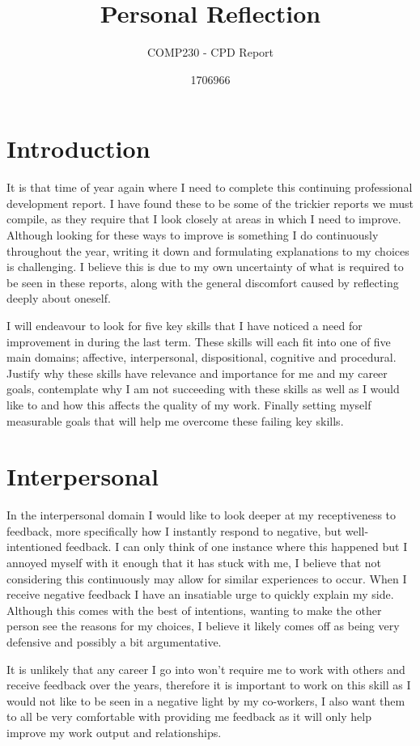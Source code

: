 \documentclass{scrartcl}
\title{Personal Reflection}
\subtitle{COMP230 - CPD Report}
\author{1706966}
\begin{document}
\maketitle

\section{Introduction}
It is that time of year again where I need to complete this continuing professional development report. I have found these to be some of the trickier reports we must compile, as they require that I look closely at areas in which I need to improve. Although looking for these ways to improve is something I do continuously throughout the year, writing it down and formulating explanations to my choices is challenging. I believe this is due to my own uncertainty of what is required to be seen in these reports, along with the general discomfort caused by reflecting deeply about oneself.

I will endeavour to look for five key skills that I have noticed a need for improvement in during the last term. These skills will each fit into one of five main domains; affective, interpersonal, dispositional, cognitive and procedural. Justify why these skills have relevance and importance for me and my career goals, contemplate why I am not succeeding with these skills as well as I would like to and how this affects the quality of my work. Finally setting myself measurable goals that will help me overcome these failing key skills.

\section{Interpersonal}
In the interpersonal domain I would like to look deeper at my receptiveness to feedback, more specifically how I instantly respond to negative, but well-intentioned feedback. I can only think of one instance where this happened but I annoyed myself with it enough that it has stuck with me, I believe that not considering this continuously may allow for similar experiences to occur. When I receive negative feedback I have an insatiable urge to quickly explain my side. Although this comes with the best of intentions, wanting to make the other person see the reasons for my choices, I believe it likely comes off as being very defensive and possibly a bit argumentative. 

It is unlikely that any career I go into won't require me to work with others and receive feedback over the years, therefore it is important to work on this skill as I would not like to be seen in a negative light by my co-workers, I also want them to all be very comfortable with providing me feedback as it will only help improve my work output and relationships.
\end{document}

